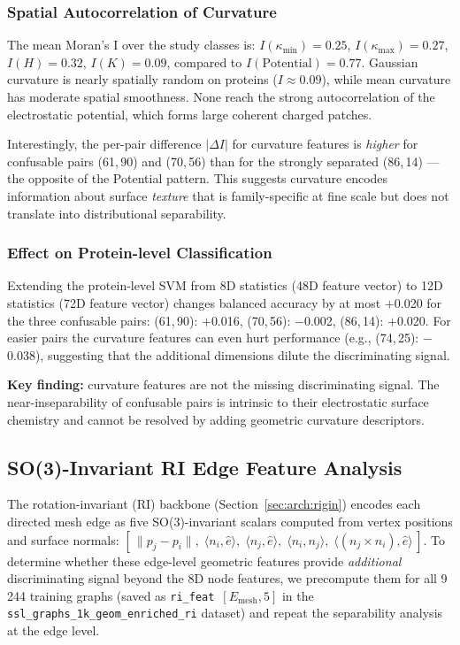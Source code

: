 \subsubsection{Spatial Autocorrelation of Curvature}

The mean Moran's I over the study classes is:
$I(\kappa_\text{min}) = 0.25$,
$I(\kappa_\text{max}) = 0.27$,
$I(H) = 0.32$,
$I(K) = 0.09$,
compared to $I(\text{Potential}) = 0.77$.
Gaussian curvature is nearly spatially random on proteins ($I \approx 0.09$),
while mean curvature has moderate spatial smoothness.
None reach the strong autocorrelation of the electrostatic potential, which
forms large coherent charged patches.

Interestingly, the per-pair difference $|\Delta I|$ for curvature features is
\textit{higher} for confusable pairs (61,\,90) and (70,\,56) than for the
strongly separated (86,\,14) --- the opposite of the Potential pattern.
This suggests curvature encodes information about surface \emph{texture} that
is family-specific at fine scale but does not translate into distributional
separability.

\subsubsection{Effect on Protein-level Classification}

Extending the protein-level SVM from 8D statistics (48D feature vector) to
12D statistics (72D feature vector) changes balanced accuracy by at most
$+$0.020 for the three confusable pairs:
(61,\,90): $+$0.016, (70,\,56): $-$0.002, (86,\,14): $+$0.020.
For easier pairs the curvature features can even hurt performance (e.g.,
(74,\,25): $-$0.038), suggesting that the additional dimensions dilute the
discriminating signal.

\textbf{Key finding:} curvature features are not the missing discriminating
signal.
The near-inseparability of confusable pairs is intrinsic to their
electrostatic surface chemistry and cannot be resolved by adding geometric
curvature descriptors.

\subsection{SO(3)-Invariant RI Edge Feature Analysis}
\label{sec:analysis:ri}

The rotation-invariant (RI) backbone (Section~\ref{sec:arch:rigin}) encodes
each directed mesh edge as five SO(3)-invariant scalars computed from vertex
positions and surface normals:
$[\,\|p_j{-}p_i\|,\; \langle n_i, \hat{e}\rangle,\;
   \langle n_j, \hat{e}\rangle,\;
   \langle n_i, n_j\rangle,\;
   \langle (n_j{\times}n_i), \hat{e}\rangle\,]$.
To determine whether these edge-level geometric features provide \emph{additional}
discriminating signal beyond the 8D node features, we precompute them for all
9\,244 training graphs (saved as \texttt{ri\_feat}~$[E_\text{mesh},5]$ in the
\texttt{ssl\_graphs\_1k\_geom\_enriched\_ri} dataset) and repeat the separability
analysis at the edge level.

